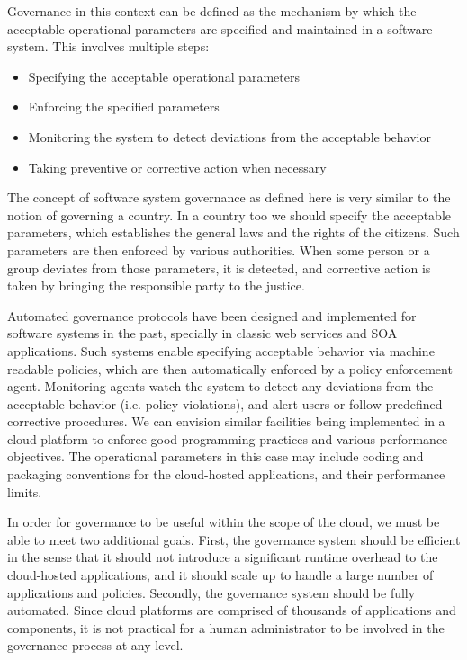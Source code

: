 Governance in this context can be defined as the mechanism by which the acceptable 
operational parameters are specified and maintained in a software system. This involves 
multiple steps:
\begin{itemize}
\item Specifying the acceptable operational parameters
\item Enforcing the specified parameters
\item Monitoring the system to detect deviations from the acceptable behavior
\item Taking preventive or corrective action when necessary
\end{itemize}

The concept of software system governance as defined here is very similar to the
notion of governing a country. In a country too we should specify the acceptable
parameters, which establishes the general laws and the rights of the citizens. Such 
parameters are then
enforced by various authorities. When some person or a group deviates from those parameters,
it is detected, and corrective action is taken by bringing the responsible party to the justice.

Automated governance protocols have been designed and implemented for software systems in
the past, specially in classic web services and SOA applications. Such systems enable specifying
acceptable behavior via machine readable policies, which are then automatically enforced by
a policy enforcement agent. Monitoring agents watch the system to detect any deviations from
the acceptable behavior (i.e. policy violations), and alert users or follow predefined corrective
procedures. We can envision similar facilities being implemented in a cloud platform to 
enforce good programming practices and various performance objectives. The operational
parameters in this case may include coding and packaging conventions for the cloud-hosted
applications, and their performance limits.

In order for governance to be
useful within the scope of the cloud, we must be able to meet two additional
goals. First, the governance system should be efficient in the sense that it should not introduce
a significant runtime overhead to the cloud-hosted applications, and it should scale up to
handle a large number of applications and policies. Secondly, the governance system should be
fully automated. Since cloud platforms are comprised of thousands of applications and components,
it is not practical for a human administrator to be involved in the governance process at any level.

